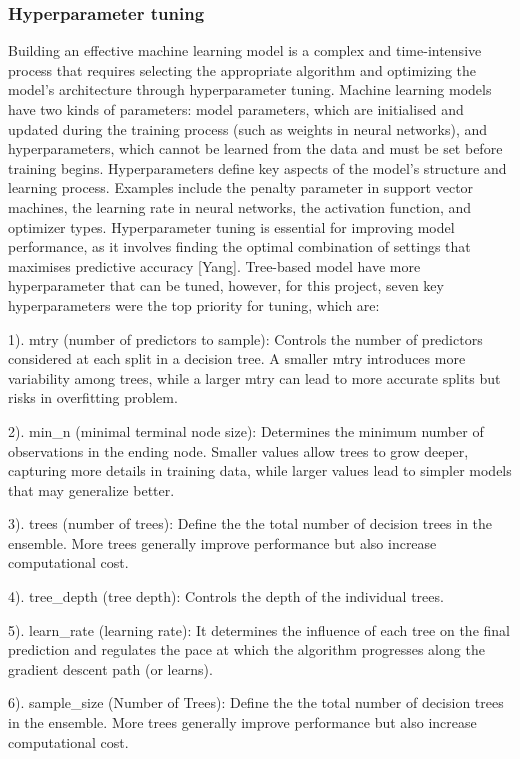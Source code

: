 \documentclass[11pt,a4paper,]{article}
\begin{document}
\subsubsection{Hyperparameter tuning}\label{hyperparameter-tuning}

Building an effective machine learning model is a complex and time-intensive process that requires selecting the appropriate algorithm and optimizing the model's architecture through hyperparameter tuning. Machine learning models have two kinds of parameters: model parameters, which are initialised and updated during the training process (such as weights in neural networks), and hyperparameters, which cannot be learned from the data and must be set before training begins. Hyperparameters define key aspects of the model's structure and learning process. Examples include the penalty parameter in support vector machines, the learning rate in neural networks, the activation function, and optimizer types. Hyperparameter tuning is essential for improving model performance, as it involves finding the optimal combination of settings that maximises predictive accuracy {[}Yang{]}. Tree-based model have more hyperparameter that can be tuned, however, for this project, seven key hyperparameters were the top priority for tuning, which are:

1). mtry (number of predictors to sample): Controls the number of predictors considered at each split in a decision tree. A smaller mtry introduces more variability among trees, while a larger mtry can lead to more accurate splits but risks in overfitting problem.

2). min\_n (minimal terminal node size): Determines the minimum number of observations in the ending node. Smaller values allow trees to grow deeper, capturing more details in training data, while larger values lead to simpler models that may generalize better.

3). trees (number of trees): Define the the total number of decision trees in the ensemble. More trees generally improve performance but also increase computational cost.

4). tree\_depth (tree depth): Controls the depth of the individual trees.

5). learn\_rate (learning rate): It determines the influence of each tree on the final prediction and regulates the pace at which the algorithm progresses along the gradient descent path (or learns).

6). sample\_size (Number of Trees): Define the the total number of decision trees in the ensemble. More trees generally improve performance but also increase computational cost.
\end{document}

